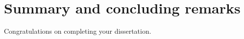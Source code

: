 \chapter{Summary and concluding remarks}
	\label{CH_summary}

Congratulations on completing your dissertation.